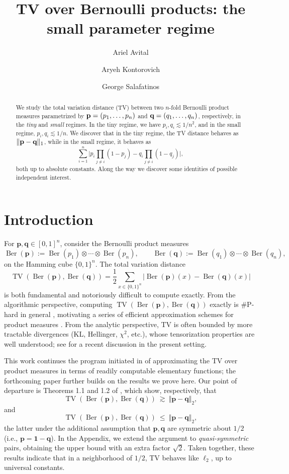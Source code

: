 \documentclass[11pt]{amsart}
\title[TV distance for Bernoulli products]{TV over Bernoulli products: the small parameter regime}
\author{Ariel Avital}
\author{Aryeh Kontorovich}
\author{George Salafatinos}
\date{} %
\numberwithin{equation}{section}
\theoremstyle{definition}
\newcommand{\TV}{\operatorname{TV}}
\newcommand{\Ber}{\operatorname{Ber}}
\newcommand{\half}{\frac{1}{2}}
\newcommand{\abs}[1]{\left|#1\right|}
\newcommand{\norm}[1]{\Vert #1 \Vert}
\newcommand{\vct}[1]{\mathbf{#1}}
\newcommand{\onevec}{\mathbf{1}}
\renewcommand{\vec}[1]{\textup{{\bf #1}}}
\newcommand{\pvec}{\vct{p}}
\newcommand{\qvec}{\vct{q}}
\begin{document}
\begin{abstract}
We study the total variation distance (TV) between two
$n$-fold Bernoulli product measures
parametrized by
$\vec p=(p_1,\ldots,p_n)$
and
$\vec q=(q_1,\ldots,q_n)$,
respectively, in the \emph{tiny} and \emph{small} regimes.
In the tiny regime, we have $p_i,q_i\lesssim 1/n^2$,
and in the small regime, $p_i,q_i\lesssim 1/n$.
We discover that in the tiny regime,
the TV distance behaves as $\|\vec p-\vec q\|_1$,
while in the small regime, it behaves as
\[
\sum_{i=1}^n
\Big|
p_i\prod_{j\neq i}(1-p_j)
-
q_i\prod_{j\neq i}(1-q_j)
\Big|,
\]
both up to absolute constants.
Along the way we discover some identities of possible independent
interest.
\end{abstract}

\maketitle

\section{Introduction}

For $\pvec,\qvec\in[0,1]^n$, consider the Bernoulli product measures
\[
\Ber(\pvec):=\Ber(p_1)\otimes\cdots\otimes\Ber(p_n),
\qquad
\Ber(\qvec):=\Ber(q_1)\otimes\cdots\otimes\Ber(q_n),
\]
on the Hamming cube $\{0,1\}^n$.
The total variation distance
\[
\TV(\Ber(\pvec),\Ber(\qvec))
=\half\sum_{x\in\{0,1\}^n}\abs{\Ber(\pvec)(x)-\Ber(\qvec)(x)}
\]
is both fundamental and notoriously difficult to compute exactly.
From the algorithmic perspective,
computing $\TV(\Ber(\pvec),\Ber(\qvec))$ exactly
is $\#\mathrm{P}$-hard in general \cite{DBLP:conf/ijcai/0001GMMPV23},
motivating
a series of
efficient approximation schemes for product measures
\cite{FengApproxTV23,Feng24Deterministically,bhattacharyya2024total}.
From the analytic perspective,
TV is often bounded
by more tractable divergences (KL, Hellinger, $\chi^2$, etc.),
whose tensorization properties are well understood;
see \cite{kon25tens} for a recent discussion in the present setting.


This work continues the program initiated in \cite{kon25tens,kontorovich2026tvhomogenization} of
approximating the TV over product measures in terms of readily computable elementary functions; the forthcoming paper \cite{KonAv26} further builds on the results we prove here. 
Our point of departure is 
Theorems 1.1 and 1.2 of
\cite{kon25tens}, which show, respectively, that
\[
\TV(\Ber(\pvec),\Ber(\qvec))\ \gtrsim\ \norm{\pvec-\qvec}_2,
\]
and
\[
\TV(\Ber(\pvec),\Ber(\qvec))\ \le\ \norm{\pvec-\qvec}_2,
\]
the latter
under the additional assumption that $\pvec,\qvec$
are
symmetric about $1/2$
(i.e., $\pvec=\onevec-\qvec$).
In the Appendix, we extend the argument to \emph{quasi-symmetric} pairs, obtaining the upper bound with an extra factor $\sqrt{2}$.
Taken together, these results indicate that in a neighborhood of $1/2$, TV behaves like $\ell_2$, up to universal constants.
\end{document}
